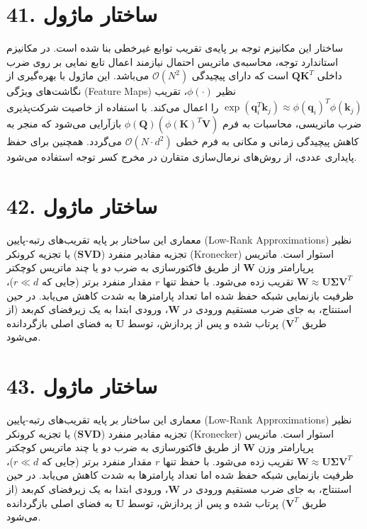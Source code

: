 \documentclass[12pt,a4paper]{report}
\begin{document}
\section*{41. ساختار ماژول }
ساختار این مکانیزم توجه بر پایه‌ی تقریب توابع غیرخطی بنا شده است. در مکانیزم استاندارد توجه، محاسبه‌ی ماتریس احتمال نیازمند اعمال تابع نمایی بر روی ضرب داخلی $\mathbf{Q} \mathbf{K}^T$ است که دارای پیچیدگی $\mathcal{O}(N^2)$ می‌باشد. این ماژول با بهره‌گیری از نگاشت‌های ویژگی (Feature Maps) نظیر $\phi(\cdot)$، تقریب $\exp(\mathbf{q}_i^T \mathbf{k}_j) \approx \phi(\mathbf{q}_i)^T \phi(\mathbf{k}_j)$ را اعمال می‌کند. با استفاده از خاصیت شرکت‌پذیری ضرب ماتریسی، محاسبات به فرم $\phi(\mathbf{Q}) (\phi(\mathbf{K})^T \mathbf{V})$ بازآرایی می‌شود که منجر به کاهش پیچیدگی زمانی و مکانی به فرم خطی $\mathcal{O}(N \cdot d^2)$ می‌گردد. همچنین برای حفظ پایداری عددی، از روش‌های نرمال‌سازی متقارن در مخرج کسر توجه استفاده می‌شود.

\section*{42. ساختار ماژول }
معماری این ساختار بر پایه تقریب‌های رتبه-پایین (Low-Rank Approximations) نظیر تجزیه مقادیر منفرد ($\mathbf{SVD}$) یا تجزیه کرونکر (Kronecker) استوار است. ماتریس پرپارامتر وزن $\mathbf{W}$ از طریق فاکتورسازی به ضرب دو یا چند ماتریس کوچکتر $\mathbf{W} \approx \mathbf{U} \mathbf{\Sigma} \mathbf{V}^T$ تقریب زده می‌شود. با حفظ تنها $r$ مقدار منفرد برتر (جایی که $r \ll d$)، ظرفیت بازنمایی شبکه حفظ شده اما تعداد پارامترها به شدت کاهش می‌یابد. در حین استنتاج، به جای ضرب مستقیم ورودی در $\mathbf{W}$، ورودی ابتدا به یک زیرفضای کم‌بعد (از طریق $\mathbf{V}^T$) پرتاب شده و پس از پردازش، توسط $\mathbf{U}$ به فضای اصلی بازگردانده می‌شود.

\section*{43. ساختار ماژول }
معماری این ساختار بر پایه تقریب‌های رتبه-پایین (Low-Rank Approximations) نظیر تجزیه مقادیر منفرد ($\mathbf{SVD}$) یا تجزیه کرونکر (Kronecker) استوار است. ماتریس پرپارامتر وزن $\mathbf{W}$ از طریق فاکتورسازی به ضرب دو یا چند ماتریس کوچکتر $\mathbf{W} \approx \mathbf{U} \mathbf{\Sigma} \mathbf{V}^T$ تقریب زده می‌شود. با حفظ تنها $r$ مقدار منفرد برتر (جایی که $r \ll d$)، ظرفیت بازنمایی شبکه حفظ شده اما تعداد پارامترها به شدت کاهش می‌یابد. در حین استنتاج، به جای ضرب مستقیم ورودی در $\mathbf{W}$، ورودی ابتدا به یک زیرفضای کم‌بعد (از طریق $\mathbf{V}^T$) پرتاب شده و پس از پردازش، توسط $\mathbf{U}$ به فضای اصلی بازگردانده می‌شود.
\end{document}
